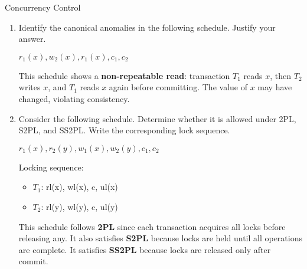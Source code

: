 \documentclass{article}
\begin{document}
\begin{exercise}{Concurrency Control}
\begin{enumerate}
    \item Identify the canonical anomalies in the following schedule. Justify your answer. 
      \begin{center}$r_1(x), w_2(x), r_1(x), c_1, c_2$\end{center}

      \begin{solution}
        This schedule shows a \textbf{non-repeatable read}: transaction $T_1$ reads $x$, then $T_2$ writes $x$, and $T_1$ reads $x$ again before committing. The value of $x$ may have changed, violating consistency.
      \end{solution}

    \item Consider the following schedule. Determine whether it is allowed under 2PL, S2PL, and SS2PL. Write the corresponding lock sequence.
      \begin{center}$r_1(x), r_2(y), w_1(x), w_2(y), c_1, c_2$\end{center}

      \begin{solution}
        Locking sequence:

        \begin{itemize}
          \item $T_1$: rl(x), wl(x), c, ul(x)
          \item $T_2$: rl(y), wl(y), c, ul(y)
        \end{itemize}

        This schedule follows \textbf{2PL} since each transaction acquires all locks before releasing any.  
        It also satisfies \textbf{S2PL} because locks are held until all operations are complete.  
        It satisfies \textbf{SS2PL} because locks are released only after commit.
      \end{solution}
  \end{enumerate}
\end{exercise}
\end{document}
